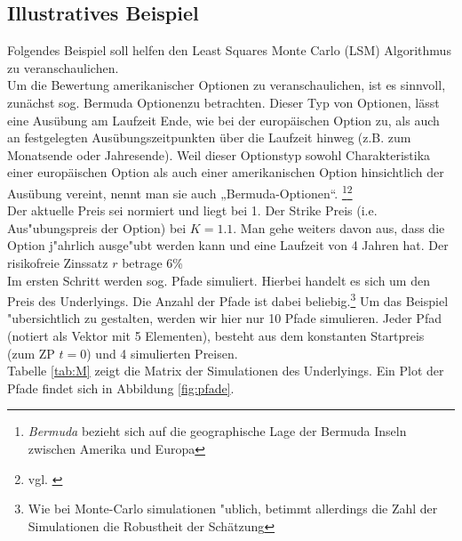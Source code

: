 \documentclass[10pt,a4paper]{article}\usepackage[]{graphicx}\usepackage[]{color}
\begin{document}
\subsection{Illustratives Beispiel}

Folgendes Beispiel soll helfen den Least Squares Monte Carlo (LSM) Algorithmus zu veranschaulichen. \\
Um die Bewertung amerikanischer Optionen zu veranschaulichen, ist es sinnvoll, zunächst sog. \glqq Bermuda Optionen\grqq zu betrachten. Dieser Typ von Optionen, lässt eine Ausübung am Laufzeit Ende, wie bei der europäischen Option zu, als auch an festgelegten Ausübungszeitpunkten über die Laufzeit hinweg (z.B. zum Monatsende oder Jahresende). Weil dieser Optionstyp sowohl Charakteristika einer europäischen Option als auch einer amerikanischen Option hinsichtlich der Ausübung vereint, nennt man sie auch „Bermuda-Optionen“. \footnote{\textit{Bermuda} bezieht sich auf die geographische Lage der Bermuda Inseln zwischen Amerika und Europa}\footnote{vgl. \cite{Fries}}\\
Der aktuelle Preis sei normiert und liegt bei 1. Der Strike Preis (i.e. Aus"ubungspreis der Option) bei $K=1.1$. Man gehe weiters davon aus, dass die Option j"ahrlich ausge"ubt werden kann und eine Laufzeit von 4 Jahren hat. Der risikofreie Zinssatz $r$ betrage 6\%\\
Im ersten Schritt werden sog. Pfade simuliert. Hierbei handelt es sich um den Preis des Underlyings. Die Anzahl der Pfade ist dabei beliebig.\footnote{Wie bei Monte-Carlo simulationen "ublich, betimmt allerdings die Zahl der Simulationen die Robustheit der Schätzung} Um das Beispiel "ubersichtlich zu gestalten, werden wir hier nur 10 Pfade simulieren. Jeder Pfad (notiert als Vektor mit 5 Elementen), besteht aus dem konstanten Startpreis (zum ZP $t=0$) und 4 simulierten Preisen.\\


Tabelle \ref{tab:M} zeigt die Matrix der Simulationen des Underlyings. Ein Plot der Pfade findet sich in Abbildung \ref{fig:pfade}.
\end{document}
